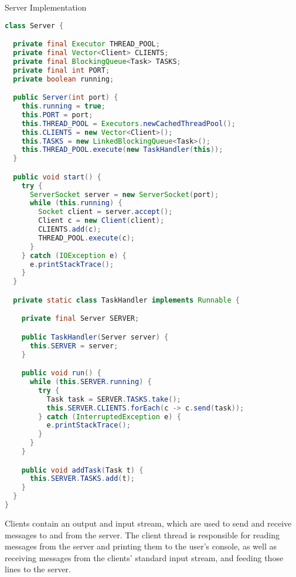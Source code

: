 \begin{cl}{Server Implementation}
\begin{lstlisting}[language=Java]
class Server {

  private final Executor THREAD_POOL;
  private final Vector<Client> CLIENTS;
  private final BlockingQueue<Task> TASKS;
  private final int PORT;
  private boolean running;

  public Server(int port) {
    this.running = true;
    this.PORT = port;
    this.THREAD_POOL = Executors.newCachedThreadPool();
    this.CLIENTS = new Vector<Client>();
    this.TASKS = new LinkedBlockingQueue<Task>();
    this.THREAD_POOL.execute(new TaskHandler(this));
  }

  public void start() {
    try {
      ServerSocket server = new ServerSocket(port);
      while (this.running) {
        Socket client = server.accept();
        Client c = new Client(client);
        CLIENTS.add(c);
        THREAD_POOL.execute(c);
      }
    } catch (IOException e) {
      e.printStackTrace();
    }
  }

  private static class TaskHandler implements Runnable {

    private final Server SERVER;

    public TaskHandler(Server server) {
      this.SERVER = server;
    }

    public void run() {
      while (this.SERVER.running) {
        try {
          Task task = SERVER.TASKS.take();
          this.SERVER.CLIENTS.forEach(c -> c.send(task));
        } catch (InterruptedException e) {
          e.printStackTrace();
        }
      }
    }

    public void addTask(Task t) {
      this.SERVER.TASKS.add(t);
    }
  }
}
\end{lstlisting}
\end{cl}

Clients contain an output and input stream, which are used to send and receive messages to and from the server. The client thread is responsible for reading messages from the server and printing them to the user's console, as well as receiving messages from the clients' standard input stream, and feeding those lines to the server. 

